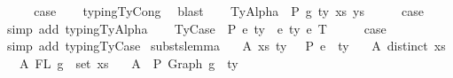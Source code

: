 \begin{isabellebody}
\ \ \isamarkupfalse%
\ \isamarkupfalse%
\ {\isacharquery}{\kern0pt}case\isanewline
\ \ \isamarkupfalse%
\ typing{\isachardot}{\kern0pt}TyCong\ \isamarkupfalse%
\ blast\isanewline
{}\isamarkupfalse%
\isanewline
\ \ \isamarkupfalse%
\ {\isacharparenleft}{\kern0pt}TyAlpha\ {\isasymGamma}{}\ P\ g\ ty\ xs\ ys{\isacharparenright}{\kern0pt}\isanewline
\ \ \isamarkupfalse%
\ \isamarkupfalse%
\ {\isacharquery}{\kern0pt}case\isanewline
\ \ \isamarkupfalse%
\ {\isacharparenleft}{\kern0pt}simp\ add{\isacharcolon}{\kern0pt}\ typing{\isachardot}{\kern0pt}TyAlpha{\isacharparenright}{\kern0pt}\isanewline
{}\isamarkupfalse%
\isanewline
\ \ \isamarkupfalse%
\ {\isacharparenleft}{\kern0pt}TyCase\ {\isasymGamma}\ P\ e{}\ ty{}\ {\isasymGamma}{}\ e{}\ ty{}\ e{}\ T{\isacharparenright}{\kern0pt}\isanewline
\ \ \isamarkupfalse%
\ \isamarkupfalse%
\ {\isacharquery}{\kern0pt}case\isanewline
\ \ \isamarkupfalse%
\ {\isacharparenleft}{\kern0pt}simp\ add{\isacharcolon}{\kern0pt}\ typing{\isachardot}{\kern0pt}TyCase{\isacharparenright}{\kern0pt}\isanewline
{}\isamarkupfalse%
%
\endisatagproof
{\isafoldproof}%
%
\isadelimproof
\isanewline
%
\endisadelimproof
\isanewline
\isanewline
{}\isamarkupfalse%
\ substs{\isacharunderscore}{\kern0pt}lemma{}{\isacharcolon}{\kern0pt}\isanewline
\ \ \ A{}{\isacharcolon}{\kern0pt}\ {\isachardoublequoteopen}{\isacharparenleft}{\kern0pt}xs{\isacharcomma}{\kern0pt}\ ty{\isacharparenright}{\kern0pt}\ {\isacharhash}{\kern0pt}\ {\isasymGamma}{}\ {\isasymturnstile}{\isacharbraceleft}{\kern0pt}P{\isacharbraceright}{\kern0pt}\ e{}\ {\isacharcolon}{\kern0pt}\ ty{}{\isachardoublequoteclose}\isanewline
\ \ \ A{}{\isacharcolon}{\kern0pt}\ {\isachardoublequoteopen}distinct\ xs{\isachardoublequoteclose}\isanewline
\ \ \ A{}{\isacharcolon}{\kern0pt}\ {\isachardoublequoteopen}FL\ g\ {\isacharequal}{\kern0pt}\ set\ xs{\isachardoublequoteclose}\isanewline
\ \ \ A{}{\isacharcolon}{\kern0pt}\ {\isachardoublequoteopen}{\isacharbrackleft}{\kern0pt}{\isacharbrackright}{\kern0pt}\ {\isasymturnstile}{\isacharbraceleft}{\kern0pt}P{\isacharbraceright}{\kern0pt}\ {\isacharparenleft}{\kern0pt}Graph\ g{\isacharparenright}{\kern0pt}\ {\isacharcolon}{\kern0pt}\ ty{\isachardoublequoteclose}\isanewline

\end{isabellebody}
